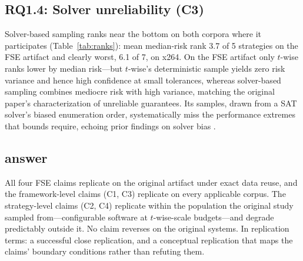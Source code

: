 
\subsection{RQ1.4: Solver unreliability (C3)}

Solver-based sampling ranks near the bottom on both corpora where it
participates (Table~\ref{tab:ranks}): mean median-risk rank 3.7 of 5
strategies on the FSE artifact and clearly worst, 6.1 of 7, on x264. On
the FSE artifact only $t$-wise ranks lower by median risk---but
$t$-wise's deterministic sample yields zero risk variance and hence high
confidence at small tolerances, whereas solver-based sampling combines
mediocre risk with high variance, matching the original paper's
characterization of unreliable guarantees. Its samples, drawn from a SAT
solver's biased enumeration order, systematically miss the performance
extremes that bounds require, echoing prior findings on solver bias
\citep{plazar2019uniform}.


\subsection{\rqone{} answer}

All four FSE claims replicate on the original artifact under exact data
reuse, and the framework-level claims (C1, C3) replicate on every
applicable corpus. The strategy-level claims (C2, C4) replicate within
the population the original study sampled from---configurable software at
$t$-wise-scale budgets---and degrade predictably outside it. No claim
reverses on the original systems. In replication terms: a successful
close replication, and a conceptual replication that maps the claims'
boundary conditions rather than refuting them.
